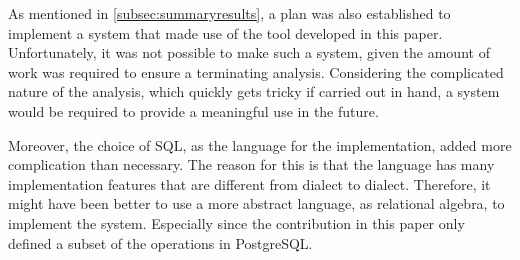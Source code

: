 As mentioned in \autoref{subsec:summaryresults}, a plan was also established to implement a system that made use of the tool developed in this paper.
Unfortunately, it was not possible to make such a system, given the amount of work was required to ensure a terminating analysis.
Considering the complicated nature of the analysis, which quickly gets tricky if carried out in hand, a system would be required to provide a meaningful use in the future.


Moreover, the choice of SQL, as the language for the implementation, added more complication than necessary.
The reason for this is that the language has many implementation features that are different from dialect to dialect.
Therefore, it might have been better to use a more abstract language, as relational algebra, to implement the system.
Especially since the contribution in this paper only defined a subset of the operations in PostgreSQL.
